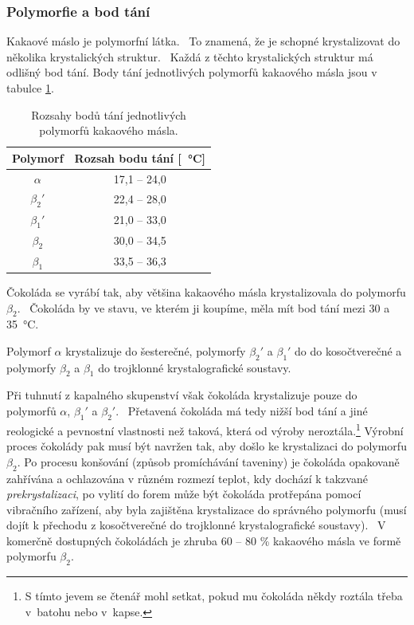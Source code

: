 \documentclass[12pt]{article}
\begin{document}
\subsubsection{Polymorfie a bod tání}
\label{sec:polymorfie}
Kakaové máslo je polymorfní látka.~\cite{Article:cocoa_butter_polymorphism} To znamená, že je schopné krystalizovat do několika krystalických struktur.~\cite{wiki:Polymorfie} Každá z těchto krystalických struktur má odlišný bod tání. Body tání jednotlivých polymorfů kakaového másla jsou v tabulce \ref{tab:polymorfy}.
\begin{table}[]
    \centering
    \begin{tabular}{|c|c|}
        \hline
        Polymorf & Rozsah bodu tání [\SI{}{\degreeCelsius}] \\\hline
        $\alpha$ & 17,1 -- 24,0\\
        $\beta_2'$ & 22,4 -- 28,0\\
        $\beta_1'$ & 21,0 -- 33,0\\
        $\beta_2$ & 30,0 -- 34,5\\
        $\beta_1$ & 33,5 -- 36,3\\
        \hline
    \end{tabular}
    \caption{Rozsahy bodů tání jednotlivých polymorfů kakaového másla.\cite{Article:cocoa_butter_polymorphism}}
    \label{tab:polymorfy}
\end{table}
Čokoláda se vyrábí tak, aby většina kakaového másla krystalizovala do polymorfu $\beta_2$.~\cite{Article:cocoa_butter_tempering} Čokoláda by ve stavu, ve kterém ji koupíme, měla mít bod tání mezi 30 a \SI{35}{\degreeCelsius}.
\par\noindent
Polymorf $\alpha$ krystalizuje do šesterečné, polymorfy $\beta_2'$ a $\beta_1'$ do do kosočtverečné a polymorfy $\beta_2$ a $\beta_1$ do trojklonné krystalografické soustavy.~\cite{Article:precrystallization}\cite{wiki:crystal_structure}
\par\noindent
Při tuhnutí z kapalného skupenství však čokoláda krystalizuje pouze do polymorfů $\alpha$, $\beta_1'$ a $\beta_2'$.~\cite{Article:molecular_polymorphism} Přetavená čokoláda má tedy nižší bod tání a jiné reologické a pevnostní vlastnosti než taková, která od výroby neroztála.\footnote{S tímto jevem se čtenář mohl setkat, pokud mu čokoláda někdy roztála třeba v~batohu nebo v~kapse.} Výrobní proces čokolády pak musí být navržen tak, aby došlo ke krystalizaci do polymorfu $\beta_2$. Po procesu konšování (způsob promíchávání taveniny) je čokoláda opakovaně zahřívána a ochlazována v různém rozmezí teplot, kdy dochází k takzvané \emph{prekrystalizaci}, po vylití do forem může být čokoláda protřepána pomocí vibračního zařízení, aby byla zajištěna krystalizace do správného polymorfu (musí dojít k přechodu z kosočtverečné do trojklonné krystalografické soustavy).~\cite{wiki:čokoláda}\cite{wiki:konšování}\cite{Article:viscosity_molten_milk_chocolate} V komerčně dostupných čokoládách je zhruba 60 -- 80 \% kakaového másla ve formě polymorfu $\beta_2$.~\cite{Article:precrystallization}
\end{document}
